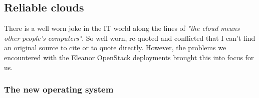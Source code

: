 \documentclass{article}
\newcommand{\openstack} {OpenStack\xspace}
\newcommand{\eleanor} {Eleanor\xspace}
\begin{document}
\subsection{Reliable clouds}
\label{reliable-clouds}

There is a well worn joke in the IT world along the lines of \textit{"the cloud means other people's computers"}. So well worn, re-quoted and conflicted that I can't find an original source to cite or to quote directly.
However, the problems we encountered with the \eleanor \openstack deployments brought this into focus for us.

\subsubsection{The new operating system}
\label{the-new-operating-system}


\printbibliography
\end{document}
